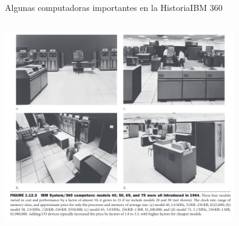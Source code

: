 \documentclass[aspectratio=169,compress]{beamer}
\begin{document}
\begin{frame} {Algunas computadoras importantes en la Historia}{IBM 360} 

    \begin{columns}[onlytextwidth,T]
      \column{\dimexpr\linewidth-50mm-5mm}


    \includegraphics[width=100mm]{images/3602.png}


    \end{columns}

\end{frame}
\end{document}
